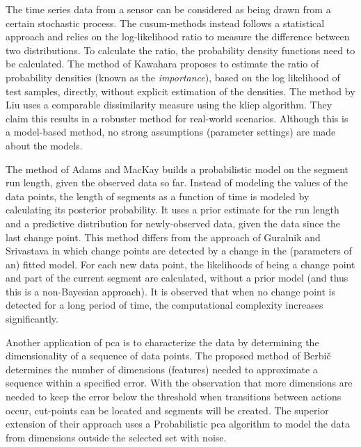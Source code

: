 The time series data from a sensor can be considered as being drawn from a certain stochastic process.
The \gls{cusum}-methods instead follows a statistical approach and relies on the log-likelihood ratio \cite{gustafsson1996marginalized} to measure the difference between two distributions.
To calculate the ratio, the probability density functions need to be calculated.
The method of Kawahara \etal \cite{kawahara2009change} proposes to estimate the ratio of probability densities (known as the \emph{importance}), based on the log likelihood of test samples, directly, without explicit estimation of the densities.
The method by Liu \etal \cite{liu2013change} uses a comparable dissimilarity measure using the \gls{kliep} algorithm.
They claim this results in a robuster method for real-world scenarios.
Although this is a model-based method, no strong assumptions (parameter settings) are made about the models.

The method of Adams and MacKay \cite{adams2007bayesian} builds a probabilistic model on the segment run length, given the observed data so far.
Instead of modeling the values of the data points, the length of segments as a function of time is modeled by calculating its posterior probability.
It uses a prior estimate for the run length and a predictive distribution for newly-observed data, given the data since the last change point.
This method differs from the approach of Guralnik and Srivastava \cite{guralnik1999event} in which change points are detected by a change in the (parameters of an) fitted model.
For each new data point, the likelihoods of being a change point and part of the current segment are calculated, without a prior model (and thus this is a non-Bayesian approach).
It is observed that when no change point is detected for a long period of time, the computational complexity increases significantly.

Another application of \gls{pca} is to characterize the data by determining the dimensionality of a sequence of data points.
The proposed method of Berbi\v{c} \etal \cite{barbivc2004segmenting} determines the number of dimensions (features) needed to approximate a sequence within a specified error.
With the observation that more dimensions are needed to keep the error below the threshold when transitions between actions occur, cut-points can be located and segments will be created.
The superior extension of their approach uses a Probabilistic \gls{pca} algorithm to model the data from dimensions outside the selected set with noise.

